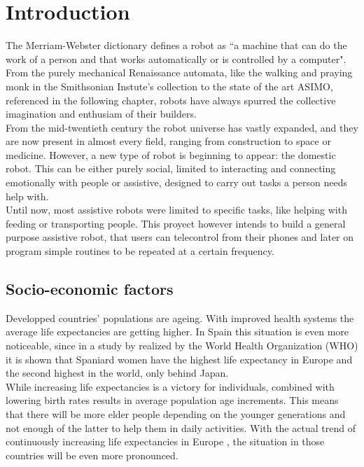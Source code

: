 \section{Introduction}

The Merriam-Webster dictionary defines a robot as ``a machine that can do the work of a person and that works automatically or is controlled by a computer". From the purely mechanical Renaissance automata, like the walking and praying monk in the Smithsonian Instute's collection\cite{automata-monk}  to the state of the art ASIMO, referenced in the following chapter, robots have always spurred the collective imagination and enthusiam of their builders.\\
	
	
From the mid-twentieth century the robot universe has vastly expanded, and they are now present in almost every field, ranging from construction\cite{robot-construction} to space\cite{robot-space} or medicine\cite{robot-medicine}. However, a new type of robot is beginning to appear: the domestic robot. This can be either purely social, limited to interacting and connecting emotionally with people\cite{robot-social} or assistive, designed to carry out tasks a person needs help with\cite{jardon2011personal}.\\

Until now, most assistive robots were limited to specific tasks, like helping with feeding or transporting people. This proyect however intends to build a general purpose assistive robot, that users can telecontrol from their phones and later on program simple routines to be repeated at a certain frequency.


\subsection{Socio-economic factors}

Developped countries' populations are ageing. With improved health systems the average life expectancies are getting higher. In Spain this situation is even more noticeable, since in a study by realized by the World Health Organization (WHO) \cite{who-life} it is shown that Spaniard women have the highest life expectancy in Europe and the second highest in the world, only behind Japan.\\

While increasing life expectancies is a victory for individuals, combined with lowering birth rates results in average population age increments. This means that there will be more elder people depending on the younger generations and not enough of the latter to help them in daily activities.
With the actual trend of continuously increasing life expectancies in Europe \cite{life-future}, the situation in those countries will be even more pronounced.\\

